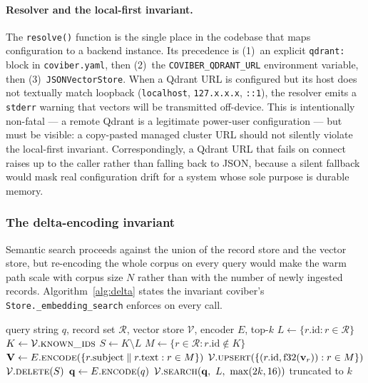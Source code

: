 \paragraph{Resolver and the local-first invariant.}
The \texttt{resolve()} function is the single place in the codebase
that maps configuration to a backend instance. Its precedence is
(1)~an explicit \texttt{qdrant:} block in \texttt{coviber.yaml}, then
(2)~the \texttt{COVIBER\_QDRANT\_URL} environment variable, then
(3)~\texttt{JSONVectorStore}. When a Qdrant URL is configured but its
host does not textually match loopback (\texttt{localhost},
\texttt{127.x.x.x}, \texttt{::1}), the resolver emits a
\texttt{stderr} warning that vectors will be transmitted off-device.
This is intentionally non-fatal — a remote Qdrant is a legitimate
power-user configuration — but must be visible: a copy-pasted managed
cluster URL should not silently violate the local-first invariant.
Correspondingly, a Qdrant URL that fails on connect raises up to the
caller rather than falling back to JSON, because a silent fallback
would mask real configuration drift for a system whose sole purpose is
durable memory.

\subsubsection{The delta-encoding invariant}
\label{sec:delta-invariant}

Semantic search proceeds against the union of the record store and the
vector store, but re-encoding the whole corpus on every query would
make the warm path scale with corpus size $N$ rather than with the
number of newly ingested records. Algorithm~\ref{alg:delta} states the
invariant coviber's \texttt{Store.\_embedding\_search} enforces on
every call.

\begin{algorithm}[t]
\caption{Delta-reconcile-and-search (\texttt{Store.\_embedding\_search}).}
\label{alg:delta}
\begin{algorithmic}[1]
\Require query string $q$, record set $\mathcal{R}$, vector store $\mathcal{V}$, encoder $E$, top-$k$
\State $L \gets \{r.\mathrm{id} : r \in \mathcal{R}\}$ 
\State $K \gets \mathcal{V}.\Call{known\_ids}{}$
\State $S \gets K \setminus L$ 
\State $M \gets \{r \in \mathcal{R} : r.\mathrm{id} \notin K\}$ 
    \State $\mathbf{V} \gets E.\Call{encode}{\{r.\mathrm{subject} \parallel r.\mathrm{text} : r \in M\}}$
    \State $\mathcal{V}.\Call{upsert}{\{(r.\mathrm{id}, \mathrm{f32}(\mathbf{v}_r)) : r \in M\}}$
\EndIf
{} \State $\mathcal{V}.\Call{delete}{S}$ \EndIf
\State $\mathbf{q} \gets E.\Call{encode}{q}$
\State \Return $\mathcal{V}.\Call{search}{\mathbf{q},\ L,\ \max(2k, 16)}$ truncated to $k$
\end{algorithmic}
\end{algorithm}


